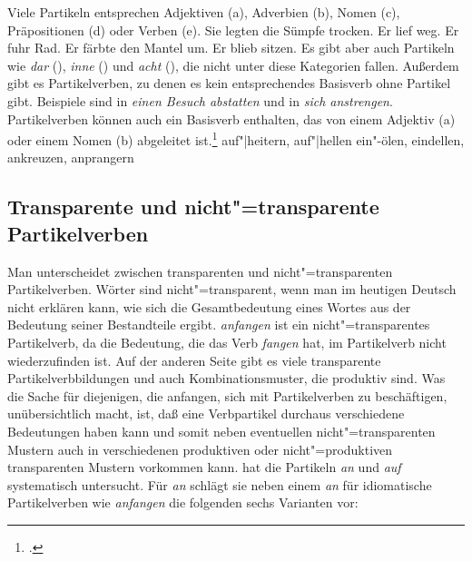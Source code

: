 Viele Partikeln entsprechen Adjektiven (a), Adverbien (b), Nomen (c), 
Präpositionen (d) oder Verben (e).
\eal
\ex{}
Sie legten die Sümpfe trocken.
\ex{}
Er lief weg.
\ex{}
Er fuhr Rad.
\ex{}
Er färbte den Mantel um.
\ex{}
Er blieb sitzen.
\zl
%
Es gibt aber auch Partikeln wie \emph{dar} (), 
\emph{inne} () und \emph{acht} 
(), die nicht unter diese Kategorien fallen.
Außerdem gibt es Partikelverben, zu denen es kein entsprechendes Basisverb ohne
Partikel gibt. Beispiele sind  in \emph{einen Besuch abstatten} und 
 in \emph{sich anstrengen}. Partikelverben können
auch ein Basisverb enthalten, das von einem Adjektiv (a) oder einem Nomen (b) abgeleitet ist.\footnote{
        .%
}
\eal
\ex auf"|heitern, auf"|hellen
\ex ein"-ölen, eindellen, ankreuzen, anprangern
\zl

\subsection{Transparente und nicht"=transparente Partikelverben}

Man unterscheidet zwischen transparenten und nicht"=transparenten Partikelverben. Wörter
sind nicht"=transparent, wenn man im heutigen Deutsch nicht erklären kann, wie sich die
Gesamtbedeutung eines Wortes aus der Bedeutung seiner Bestandteile ergibt. \emph{anfangen}
ist \zb ein nicht"=transparentes Partikelverb, da die Bedeutung, die das Verb \emph{fangen}
hat, im Partikelverb nicht wiederzufinden ist. Auf der anderen Seite gibt es viele transparente
Partikelverbbildungen und auch Kombinationsmuster, die produktiv sind. Was die Sache
für diejenigen, die anfangen, sich mit Partikelverben zu beschäftigen, unübersichtlich macht, ist,
daß eine Verbpartikel durchaus verschiedene Bedeutungen haben kann und somit
neben eventuellen nicht"=transparenten Mustern auch in verschiedenen
produktiven oder nicht"=produktiven transparenten Mustern vorkommen kann.
\citet{Stiebels96a} hat die Partikeln \emph{an} und \emph{auf} systematisch untersucht.
Für \emph{an} schlägt sie neben einem \emph{an} für idiomatische Partikelverben wie \emph{anfangen}
die folgenden sechs Varianten vor:

